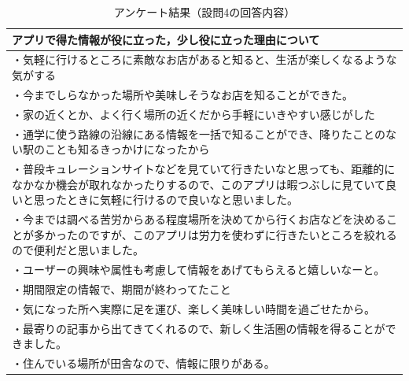 \documentclass[a4paper]{jsarticle}
\begin{document}
\begin{enumerate}
\begin{enumerate}
\begin{enumerate}
  \begin{table}[H]
    \begin{center}
      \caption{アンケート結果（設問4の回答内容）}
      \renewcommand\arraystretch{1.2}
      \begin{tabular}{|p{15cm}|}
        \hline
        アプリで得た情報が役に立った，少し役に立った理由について \\
        \hline
        ・気軽に行けるところに素敵なお店があると知ると、生活が楽しくなるような気がする \\
        ・今までしらなかった場所や美味しそうなお店を知ることができた。 \\
        ・家の近くとか、よく行く場所の近くだから手軽にいきやすい感じがした \\
        ・通学に使う路線の沿線にある情報を一括で知ることができ、降りたことのない駅のことも知るきっかけになったから \\
        ・普段キュレーションサイトなどを見ていて行きたいなと思っても、距離的になかなか機会が取れなかったりするので、このアプリは暇つぶしに見ていて良いと思ったときに気軽に行けるので良いなと思いました。 \\
        ・今までは調べる苦労からある程度場所を決めてから行くお店などを決めることが多かったのですが、このアプリは労力を使わずに行きたいところを絞れるので便利だと思いました。 \\
        ・ユーザーの興味や属性も考慮して情報をあげてもらえると嬉しいなーと。 \\
        ・期間限定の情報で、期間が終わってたこと \\
        ・気になった所へ実際に足を運び、楽しく美味しい時間を過ごせたから。 \\
        ・最寄りの記事から出てきてくれるので、新しく生活圏の情報を得ることができました。 \\
        ・住んでいる場所が田舎なので、情報に限りがある。\\
        \hline
      \end{tabular}
      \label{tab:curation-04-result}
    \end{center}
  \end{table}


\end{enumerate}
\end{enumerate}
\end{enumerate}
\end{document}
